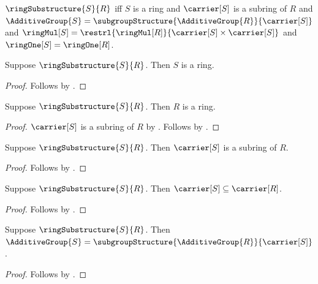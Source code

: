 \begin{definition}\label{ring_substructure}
    $\ringSubstructure{S}{R}$ iff
        $S$ is a ring and
        $\carrier[S]$ is a subring of $R$ and
        $\AdditiveGroup{S}
            =\subgroupStructure{\AdditiveGroup{R}}{\carrier[S]}$ and
        $\ringMul[S]
            =\restrl{\ringMul[R]}{
                \carrier[S]\times\carrier[S]}$ and
        $\ringOne[S]=\ringOne[R]$.
\end{definition}

\begin{proposition}\label{ring_substructure_is_ring}
    Suppose $\ringSubstructure{S}{R}$.
    Then $S$ is a ring.
\end{proposition}
\begin{proof}
    Follows by .
\end{proof}

\begin{proposition}\label{ring_substructure_ambient_ring}
    Suppose $\ringSubstructure{S}{R}$.
    Then $R$ is a ring.
\end{proposition}
\begin{proof}
    $\carrier[S]$ is a subring of $R$ by
        .
    Follows by .
\end{proof}

\begin{proposition}\label{ring_substructure_carrier_subring}
    Suppose $\ringSubstructure{S}{R}$.
    Then $\carrier[S]$ is a subring of $R$.
\end{proposition}
\begin{proof}
    Follows by .
\end{proof}

\begin{corollary}\label{ring_substructure_carrier_subseteq}
    Suppose $\ringSubstructure{S}{R}$.
    Then $\carrier[S]\subseteq\carrier[R]$.
\end{corollary}
\begin{proof}
    Follows by
        .
\end{proof}

\begin{proposition}\label{ring_substructure_additive_group}
    Suppose $\ringSubstructure{S}{R}$.
    Then $\AdditiveGroup{S}
        =\subgroupStructure{\AdditiveGroup{R}}{\carrier[S]}$.
\end{proposition}
\begin{proof}
    Follows by .
\end{proof}

